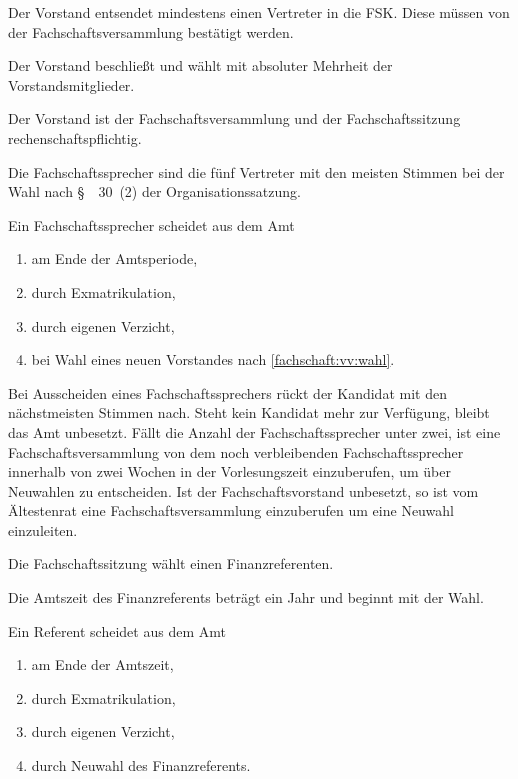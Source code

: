 \documentclass[a4paper, parskip=half, numbers=noenddot]{scrartcl}
\begin{document}
\begin{contract}
Der Vorstand entsendet mindestens einen Vertreter in die FSK. Diese müssen von der Fachschaftsversammlung bestätigt werden.

Der Vorstand beschließt und wählt mit absoluter Mehrheit der Vorstandsmitglieder.

Der Vorstand ist der Fachschaftsversammlung und der Fachschaftssitzung rech\-en\-schafts\-pflichtig.


%
%

%
\label{fs:sprecher}

Die Fachschaftssprecher sind die fünf Vertreter mit den meisten Stimmen bei der Wahl nach §~~30~(2) der Organisationssatzung.

Ein Fachschaftssprecher scheidet aus dem Amt
  \begin{enumerate}
  \item am Ende der Amtsperiode,
  \item durch Exmatrikulation,
  \item durch eigenen Verzicht,
  \item bei Wahl eines neuen Vorstandes nach \ref{fachschaft:vv:wahl}.
\end{enumerate}

Bei Ausscheiden eines Fach\-schaftssprechers rückt der Kandidat mit den nächstmeisten Stimmen nach. Steht kein Kandidat mehr zur Verfügung, bleibt das Amt unbesetzt. Fällt die Anzahl der Fachschaftssprecher unter zwei, ist eine Fachschaftsversammlung von dem noch verbleibenden Fachschaftssprecher innerhalb von zwei Wochen in der Vorlesungszeit einzuberufen, um über Neuwahlen zu entscheiden. Ist der Fachschaftsvorstand unbesetzt, so ist vom Ältestenrat eine Fachschaftsversammlung einzuberufen um eine Neuwahl einzuleiten.


%
%


Die Fachschaftssitzung wählt einen Finanzreferenten.

Die Amtszeit des Finanzreferents beträgt ein Jahr und beginnt mit der Wahl.

Ein Referent scheidet aus dem Amt
\begin{enumerate}
\item am Ende der Amtszeit,
\item durch Exmatrikulation,
\item durch eigenen Verzicht,
\item durch Neuwahl des Finanzreferents.
\end{enumerate}


\end{contract}
\end{document}
